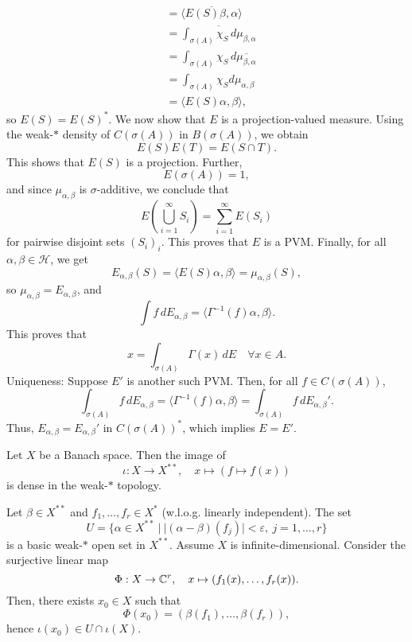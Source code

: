 \begin{myproof}
\begin{align*}
    &= \overline{\langle E(S) \beta, \alpha \rangle}\\
    &= \overline{\int_{\sigma(A)} \chi_S\, d\mu_{\beta, \alpha}}\\
    &= \int_{\sigma(A)} \chi_S\, d\overline{\mu_{\beta, \alpha}}\\
    &= \int_{\sigma(A)} \chi_S d\mu_{\alpha, \beta}\\
    &= \langle E(S) \alpha, \beta\rangle,
  \end{align*}
  so $E(S) = E(S)^*$.
  We now show that $E$ is a projection-valued measure. Using the weak-$*$ density of $C(\sigma(A))$ in $B(\sigma(A))$, we obtain
  $$E(S)E(T) = E(S \cap T).$$
  This shows that $E(S)$ is a projection.
  Further, 
  $$E(\sigma(A)) = 1,$$
  and since $\mu_{\alpha, \beta}$ is $\sigma$-additive, we conclude that
  $$E\left(\bigcup_{i = 1} ^\infty S_i\right) = \sum_{i = 1}^\infty E(S_i)$$
  for pairwise disjoint sets $(S_i)_i$. This proves that $E$ is a PVM.
  Finally, for all $\alpha, \beta \in \mathcal{H}$, we get 
  $$E_{\alpha, \beta} (S) = \langle E(S)\alpha, \beta\rangle = \mu_{\alpha, \beta} (S),$$
  so $\mu_{\alpha, \beta} = E_{\alpha, \beta}$, and
  $$\int f\, dE_{\alpha, \beta} = \langle \Gamma^{-1} (f) \alpha, \beta\rangle.$$
  This proves that 
  $$x = \int_{\sigma(A)} \Gamma(x)\, dE \quad \forall x \in A.$$
  Uniqueness: Suppose $E'$ is another such PVM. Then, for all $f \in C(\sigma(A))$,
  $$\int_{\sigma(A)} f\, dE_{\alpha, \beta} = \langle \Gamma^{-1} (f)\alpha, \beta\rangle = \int_{\sigma(A)} f\, dE_{\alpha, \beta}'.$$
  Thus, $E_{\alpha, \beta} = E_{\alpha, \beta} '$ in $C(\sigma(A))^*$, which implies $E = E'$.
\end{myproof}

\begin{lemma}
  Let $X$ be a Banach space. Then the image of 
  $$\iota: X \to X^{**},\quad x \mapsto (f \mapsto f(x))$$
  is dense in the weak-$*$ topology.
\end{lemma}

\begin{myproof}
  Let $\beta \in X^{**}$ and $f_1, \dots, f_r \in X^*$ (w.l.o.g. linearly independent).
  The set
  $$U = \{\alpha \in X^{**}\ |\ |(\alpha - \beta) (f_j)| < \varepsilon,\ j = 1, \dots, r\}$$
  is a basic weak-$*$ open set in $X^{**}$.
  Assume $X$ is infinite-dimensional. Consider the surjective linear map 
  $$\Phi: X \to \mathbb {C}^r,\quad x \mapsto (f_1 (x),\dots, f_r (x)).$$
  Then, there exists $x_0 \in X$ such that 
  $$\Phi(x_0) = (\beta(f_1), \dots, \beta(f_r)),$$
  hence $\iota (x_0) \in U \cap \iota (X)$.
\end{myproof}

